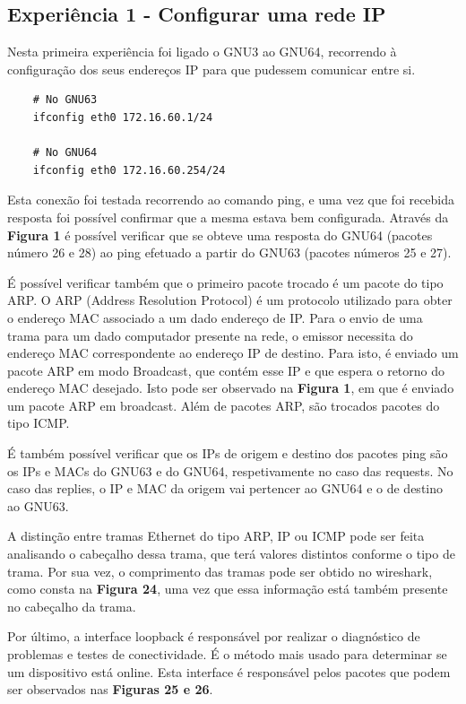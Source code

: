 \documentclass[article, a4paper, 11pt, oneside]{memoir}
\begin{document}
\subsection{Experiência 1 - Configurar uma rede IP}

Nesta primeira experiência foi ligado o GNU3 ao GNU64, recorrendo à configuração dos seus endereços IP para que pudessem comunicar entre si. 
\begin{lstlisting}
	# No GNU63
	ifconfig eth0 172.16.60.1/24

	# No GNU64
	ifconfig eth0 172.16.60.254/24
\end{lstlisting} 

Esta conexão foi testada recorrendo ao comando ping, e uma vez que foi recebida resposta foi possível confirmar que a mesma estava bem configurada. 
Através da \textbf{Figura 1} é possível verificar que se obteve uma resposta do GNU64 (pacotes número 26 e 28) ao ping efetuado a partir do GNU63
(pacotes números 25 e 27).

É possível verificar também que o primeiro pacote trocado é um pacote do tipo ARP. 
O ARP (Address Resolution Protocol) é um protocolo utilizado para obter o endereço MAC associado
a um dado endereço de IP. Para o envio de uma trama para um dado computador presente na rede, o emissor
necessita do endereço MAC correspondente ao endereço IP de destino. Para isto, é enviado um pacote ARP
em modo Broadcast, que contém esse IP e que espera o retorno do endereço MAC desejado.
Isto pode ser observado na \textbf{Figura 1}, em que é enviado um pacote ARP em broadcast.
Além de pacotes ARP, são trocados pacotes do tipo ICMP.

É também possível verificar que os IPs de origem e destino dos pacotes ping são os IPs e MACs do GNU63 e do GNU64, respetivamente no caso das requests.
No caso das replies, o IP e MAC da origem vai pertencer ao GNU64 e o de destino ao GNU63.

A distinção entre tramas Ethernet do tipo ARP, IP ou ICMP pode ser feita analisando o cabeçalho dessa trama, que terá valores distintos conforme o tipo de trama.
Por sua vez, o comprimento das tramas pode ser obtido no wireshark, como consta na \textbf{Figura 24}, uma vez que essa informação está também presente no cabeçalho da trama.

Por último, a interface loopback é responsável por realizar o diagnóstico de problemas e testes de conectividade.
É o método mais usado para determinar se um dispositivo está online. Esta interface é responsável pelos pacotes que podem
ser observados nas \textbf{Figuras 25 e 26}.
\end{document}
